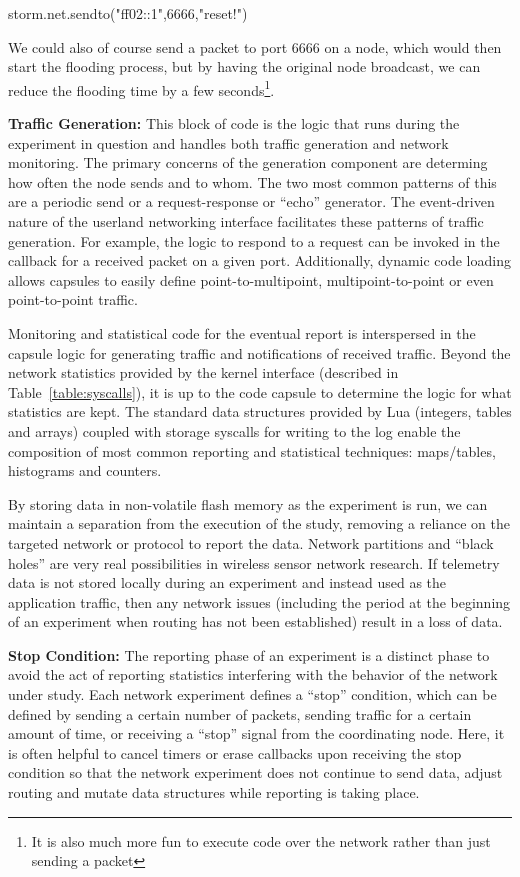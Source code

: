 \begin{luacode}
storm.net.sendto("ff02::1",6666,"reset!")
\end{luacode}

We could also of course send a packet to port 6666 on a node, which would then start the flooding process, but by having the original node broadcast, we can reduce the flooding time by a few seconds\footnote{It is also much more fun to execute code over the network rather than just sending a packet}.

\textbf{Traffic Generation:}  This block of code is the logic that runs during the experiment in question and handles both traffic generation and network monitoring.
The primary concerns of the generation component are determing how often the node sends and to whom.
The two most common patterns of this are a periodic send or a request-response or ``echo'' generator.
The event-driven nature of the userland networking interface facilitates these patterns of traffic generation.
For example, the logic to respond to a request can be invoked in the callback for a received packet on a given port.
Additionally, dynamic code loading allows capsules to easily define point-to-multipoint, multipoint-to-point or even point-to-point traffic.

Monitoring and statistical code for the eventual report is interspersed in the capsule logic for generating traffic and notifications of received traffic.
Beyond the network statistics provided by the kernel interface (described in Table~\ref{table:syscalls}), it is up to the code capsule to determine the logic for what statistics are kept.
The standard data structures provided by Lua (integers, tables and arrays) coupled with storage syscalls for writing to the log enable the composition of most common reporting and statistical techniques: maps/tables, histograms and counters.

By storing data in non-volatile flash memory as the experiment is run, we can maintain a separation from the execution of the study, removing a reliance on the targeted network or protocol to report the data.
Network partitions and ``black holes'' are very real possibilities in wireless sensor network research.
If telemetry data is not stored locally during an experiment and instead used as the application traffic, then any network issues (including the period at the beginning of an experiment when routing has not been established) result in a loss of data.

\textbf{Stop Condition:}
The reporting phase of an experiment is a distinct phase to avoid the act of reporting statistics interfering with the behavior of the network under study.
Each network experiment defines a ``stop'' condition, which can be defined by sending a certain number of packets, sending traffic for a certain amount of time, or receiving a ``stop'' signal from the coordinating node.
Here, it is often helpful to cancel timers or erase callbacks upon receiving the stop condition so that the network experiment does not continue to send data, adjust routing and mutate data structures while reporting is taking place.

